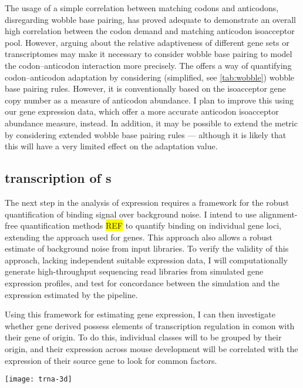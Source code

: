 The usage of a simple correlation between matching codons and anticodons,
disregarding wobble base pairing, has proved adequate to demonstrate an overall
high correlation between the codon demand and matching \trna anticodon
isoacceptor pool. However, arguing about the relative adaptiveness of different
gene sets or transcriptomes may make it  necessary to consider wobble base
pairing to model the codon--anticodon interaction more precisely. The \tai
\citep{Dos_Reis:2003} offers a way of quantifying codon--anticodon adaptation by
considering (simplified, see \cref{tab:wobble}) wobble base pairing rules.
However, it is conventionally based on the \trna isoacceptor gene copy number as
a measure of anticodon abundance. I plan to improve this using our \trna gene
expression data, which offer a more accurate anticodon isoacceptor abundance
measure, instead. In addition, it may be possible to extend the \tai metric by
considering extended wobble base pairing rules \citep{Murphy:2004} --- although
it is likely that this will have a very limited effect on the adaptation value.

\subsection{ transcription of s}

The next step in the analysis of \transsine expression requires a framework for
the robust quantification of  binding signal over background noise. I
intend to use alignment-free quantification methods \colorbox{yellow}{REF} to
quantify  binding on individual gene loci, extending the approach used for
\trna genes. This approach also allows a robust estimate of background noise
from \chip input libraries. To verify the validity of this approach, lacking
independent suitable \transsine expression data, I will computationally generate
high-throughput sequencing read libraries from simulated \transsine gene
expression profiles, and test for concordance between the simulation and the
expression estimated by the pipeline.

Using this framework for estimating \transsine gene expression, I can then
investigate whether \trna gene derived \transsine[s] possess elements of
transcription regulation in comon with their \trna gene of origin. To do this,
individual \transsine classes will to be grouped by their origin, and their
expression across mouse development will be correlated with the expression of
their source \trna gene to look for common factors.

\clearpage

\begin{center}
    \vspace*{\fill}
    \texttt{[image: trna-3d]}
    \vspace*{\fill}
\end{center}
